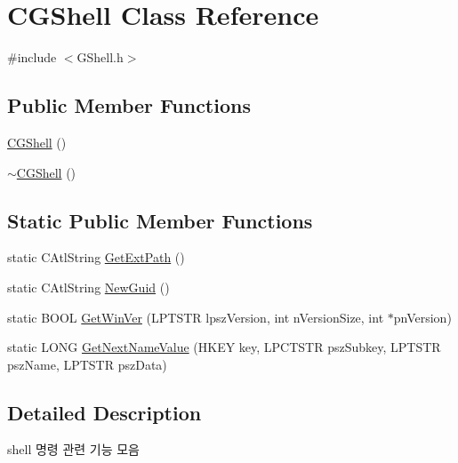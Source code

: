 \hypertarget{class_c_g_shell}{}\section{C\+G\+Shell Class Reference}
\label{class_c_g_shell}


{\ttfamily \#include $<$G\+Shell.\+h$>$}

\subsection*{Public Member Functions}
\begin{DoxyCompactItemize}
\item 
\hyperlink{class_c_g_shell_a1645f442ba54c34d6055db6e26249a05}{C\+G\+Shell} ()
\item 
\hyperlink{class_c_g_shell_ab2e9f48e53826727ef5a78d4c8735812}{$\sim$\+C\+G\+Shell} ()
\end{DoxyCompactItemize}
\subsection*{Static Public Member Functions}
\begin{DoxyCompactItemize}
\item 
static C\+Atl\+String \hyperlink{class_c_g_shell_ac6dab0b747f67d9eb201c68f6231cfe4}{Get\+Ext\+Path} ()
\item 
static C\+Atl\+String \hyperlink{class_c_g_shell_aa57e2b748ff3085b8277ae260c6e04f6}{New\+Guid} ()
\item 
static B\+O\+O\+L \hyperlink{class_c_g_shell_a155bd930d2bec888edd7847716091e43}{Get\+Win\+Ver} (L\+P\+T\+S\+T\+R lpsz\+Version, int n\+Version\+Size, int $\ast$pn\+Version)
\item 
static L\+O\+N\+G \hyperlink{class_c_g_shell_ae66bf9defb78098cd5033b9be20df6aa}{Get\+Next\+Name\+Value} (H\+K\+E\+Y key, L\+P\+C\+T\+S\+T\+R psz\+Subkey, L\+P\+T\+S\+T\+R psz\+Name, L\+P\+T\+S\+T\+R psz\+Data)
\end{DoxyCompactItemize}


\subsection{Detailed Description}

\begin{DoxyItemize}
\item shell 명령 관련 기능 모음 
\end{DoxyItemize}

